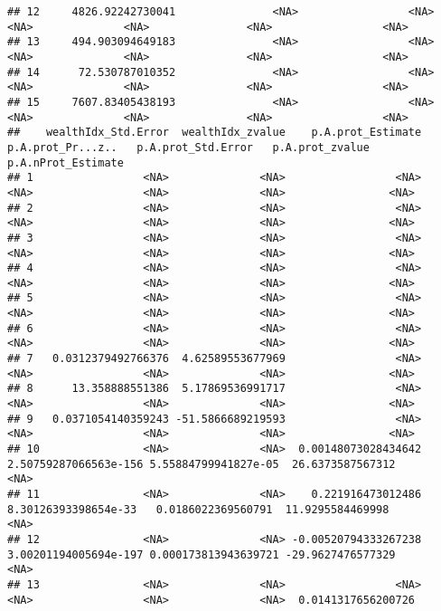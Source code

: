 \documentclass[
]{book}
\begin{document}
\begin{verbatim}
## 12     4826.92242730041               <NA>                 <NA>                <NA>              <NA>               <NA>                 <NA>
## 13     494.903094649183               <NA>                 <NA>                <NA>              <NA>               <NA>                 <NA>
## 14      72.530787010352               <NA>                 <NA>                <NA>              <NA>               <NA>                 <NA>
## 15     7607.83405438193               <NA>                 <NA>                <NA>              <NA>               <NA>                 <NA>
##    wealthIdx_Std.Error  wealthIdx_zvalue    p.A.prot_Estimate     p.A.prot_Pr...z..   p.A.prot_Std.Error   p.A.prot_zvalue  p.A.nProt_Estimate
## 1                 <NA>              <NA>                 <NA>                  <NA>                 <NA>              <NA>                <NA>
## 2                 <NA>              <NA>                 <NA>                  <NA>                 <NA>              <NA>                <NA>
## 3                 <NA>              <NA>                 <NA>                  <NA>                 <NA>              <NA>                <NA>
## 4                 <NA>              <NA>                 <NA>                  <NA>                 <NA>              <NA>                <NA>
## 5                 <NA>              <NA>                 <NA>                  <NA>                 <NA>              <NA>                <NA>
## 6                 <NA>              <NA>                 <NA>                  <NA>                 <NA>              <NA>                <NA>
## 7   0.0312379492766376  4.62589553677969                 <NA>                  <NA>                 <NA>              <NA>                <NA>
## 8      13.358888551386  5.17869536991717                 <NA>                  <NA>                 <NA>              <NA>                <NA>
## 9   0.0371054140359243 -51.5866689219593                 <NA>                  <NA>                 <NA>              <NA>                <NA>
## 10                <NA>              <NA>  0.00148073028434642 2.50759287066563e-156 5.55884799941827e-05  26.6373587567312                <NA>
## 11                <NA>              <NA>    0.221916473012486  8.30126393398654e-33   0.0186022369560791  11.9295584469998                <NA>
## 12                <NA>              <NA> -0.00520794333267238 3.00201194005694e-197 0.000173813943639721 -29.9627476577329                <NA>
## 13                <NA>              <NA>                 <NA>                  <NA>                 <NA>              <NA>  0.0141317656200726

\end{verbatim}
\end{document}
